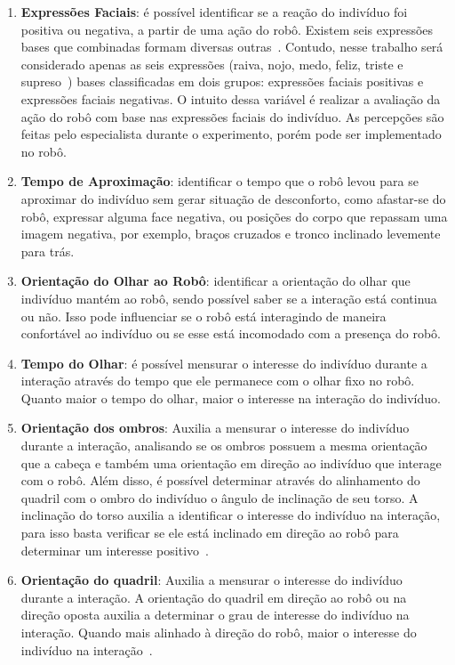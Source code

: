 \begin{enumerate}
	\item \textbf{Expressões Faciais}: é possível identificar se a reação do indivíduo foi positiva ou negativa, a partir de uma ação do robô. Existem seis expressões bases que combinadas formam diversas outras~\cite{bihan:2014}. Contudo, nesse trabalho será considerado apenas as seis expressões (raiva, nojo, medo, feliz, triste e supreso~\cite{kaitai:2011}) bases classificadas em dois grupos: expressões faciais positivas e expressões faciais negativas. O intuito dessa variável é realizar a avaliação da ação do robô com base nas expressões faciais do indivíduo. As percepções são feitas pelo especialista durante o experimento, porém pode ser implementado no robô.
	\item \textbf{Tempo de Aproximação}: identificar o tempo que o robô levou para se aproximar do indivíduo sem gerar situação de desconforto, como afastar-se do robô, expressar alguma face negativa, ou posições do corpo que repassam uma imagem negativa, por exemplo, braços cruzados e tronco inclinado levemente para trás.
	\item \textbf{Orientação do Olhar ao Robô}: identificar a orientação do olhar que indivíduo mantém ao robô, sendo possível saber se a interação está continua ou não. Isso pode influenciar se o robô está interagindo de maneira confortável ao indivíduo ou se esse está incomodado com a presença do robô.
	\item \textbf{Tempo do Olhar}: é possível mensurar o interesse do indivíduo durante a interação através do tempo que ele permanece com o olhar fixo no robô. Quanto maior o tempo do olhar, maior o interesse na interação do indivíduo.
	\item \textbf{Orientação dos ombros}: Auxilia a mensurar o interesse do indivíduo durante a interação, analisando se os ombros possuem a mesma orientação que a cabeça e também uma orientação em direção ao indivíduo que interage com o robô. Além disso, é possível determinar através do alinhamento do quadril com o ombro do indivíduo o ângulo de inclinação de seu torso. A inclinação do torso auxilia a identificar o interesse do indivíduo na interação, para isso basta verificar se ele está inclinado em direção ao robô para determinar um interesse positivo~\cite{lambert:2008}.
	\item \textbf{Orientação do quadril}: Auxilia a mensurar o interesse do indivíduo durante a interação. A orientação do quadril em direção ao robô ou na direção oposta auxilia a determinar o grau de interesse do indivíduo na interação. Quando mais alinhado à direção do robô, maior o interesse do indivíduo na interação~\cite{lambert:2008}.

\end{enumerate}
